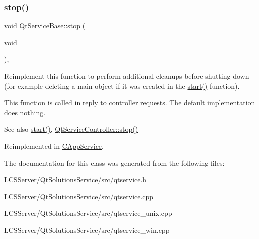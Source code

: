 \subsubsection{\texorpdfstring{stop()}{stop()}}
{\footnotesize\ttfamily void Qt\+Service\+Base\+::stop (\begin{DoxyParamCaption}\item[{void}]{ }\end{DoxyParamCaption})\hspace{0.3cm}{\ttfamily [protected]}, {\ttfamily [virtual]}}

Reimplement this function to perform additional cleanups before shutting down (for example deleting a main object if it was created in the \hyperlink{class_qt_service_base_adbc0cd621b41bd3a6a1f62fda432e9e4}{start()} function).

This function is called in reply to controller requests. The default implementation does nothing.

\begin{DoxySeeAlso}{See also}
\hyperlink{class_qt_service_base_adbc0cd621b41bd3a6a1f62fda432e9e4}{start()}, \hyperlink{class_qt_service_controller_ad06afa647666769e309474b18bf7cf90}{Qt\+Service\+Controller\+::stop()} 
\end{DoxySeeAlso}


Reimplemented in \hyperlink{class_c_app_service_a1090ba3b5428c97b01f7561c5e2bcb74}{C\+App\+Service}.



The documentation for this class was generated from the following files\+:\begin{DoxyCompactItemize}
\item 
L\+C\+S\+Server/\+Qt\+Solutions\+Service/src/qtservice.\+h\item 
L\+C\+S\+Server/\+Qt\+Solutions\+Service/src/qtservice.\+cpp\item 
L\+C\+S\+Server/\+Qt\+Solutions\+Service/src/qtservice\+\_\+unix.\+cpp\item 
L\+C\+S\+Server/\+Qt\+Solutions\+Service/src/qtservice\+\_\+win.\+cpp\end{DoxyCompactItemize}
